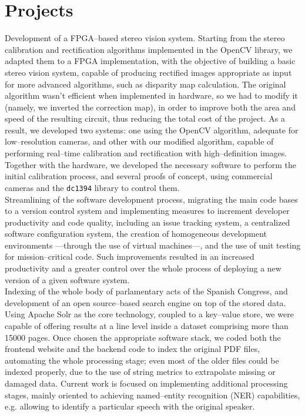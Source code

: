 \documentclass[11pt, a4paper]{article}
\newcommand{\years}[1]{\marginnote{\scriptsize #1}}
\begin{document}
\section*{Projects} %
\noindent
\years{2011\\\textsc{TEDESYS}}Development of a FPGA--based stereo vision system. Starting from the stereo calibration and rectification algorithms implemented in the OpenCV library, we adapted them to a FPGA implementation, with the objective of building a basic stereo vision system, capable of producing rectified images appropriate as input for more advanced algorithms, such as disparity map calculation. The original algorithm wasn't efficient when implemented in hardware, so we had to modify it (namely, we inverted the correction map), in order to improve both the area and speed of the resulting circuit, thus reducing the total cost of the project. As a result, we developed two systems: one using the OpenCV algorithm, adequate for low--resolution cameras, and other with our modified algorithm, capable of performing real--time calibration and rectification with high--definition images. Together with the hardware, we developed the necessary software to perform the initial calibration process, and several proofs of concept, using commercial cameras and the \texttt{dc1394} library to control them.\\
\years{2011\\\textsc{ITEISA}}Streamlining of the software development process, migrating the main code bases to a version control system and implementing measures to increment developer productivity and code quality, including an issue tracking system, a centralized software configuration system, the creation of homogeneous development environments ---through the use of virtual machines---, and the use of unit testing for mission--critical code. Such improvements resulted in an increased productivity and a greater control over the whole process of deploying a new version of a given software system.\\
\years{2011--2012\\\textsc{ITEISA}}Indexing of the whole body of parlamentary acts of the Spanish Congress, and development of an open source--based search engine on top of the stored data. Using Apache Solr as the core technology, coupled to a key--value store, we were capable of offering results at a line level inside a dataset comprising more than 15000 pages. Once chosen the appropriate software stack, we coded both the frontend website and the backend code to index the original PDF files, automating the whole processing stage; even most of the older files could be indexed properly, due to the use of string metrics to extrapolate missing or damaged data. Current work is focused on implementing additional processing stages, mainly oriented to achieving named--entity recognition (NER) capabilities, e.g. allowing to identify a particular speech with the original speaker.\\
\end{document}
